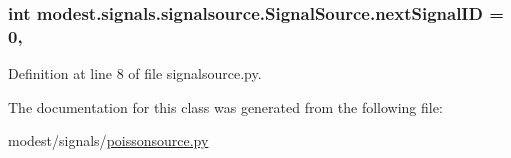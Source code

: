 \subsubsection[{\texorpdfstring{next\+Signal\+ID}{nextSignalID}}]{\setlength{\rightskip}{0pt plus 5cm}int modest.\+signals.\+signalsource.\+Signal\+Source.\+next\+Signal\+ID = 0\hspace{0.3cm}{\ttfamily [static]}, {\ttfamily [inherited]}}\hypertarget{classmodest_1_1signals_1_1signalsource_1_1SignalSource_a453eafb550b551adbec0903deb63dfce}{}\label{classmodest_1_1signals_1_1signalsource_1_1SignalSource_a453eafb550b551adbec0903deb63dfce}


Definition at line 8 of file signalsource.\+py.



The documentation for this class was generated from the following file\+:\begin{DoxyCompactItemize}
\item 
modest/signals/\hyperlink{poissonsource_8py}{poissonsource.\+py}\end{DoxyCompactItemize}
